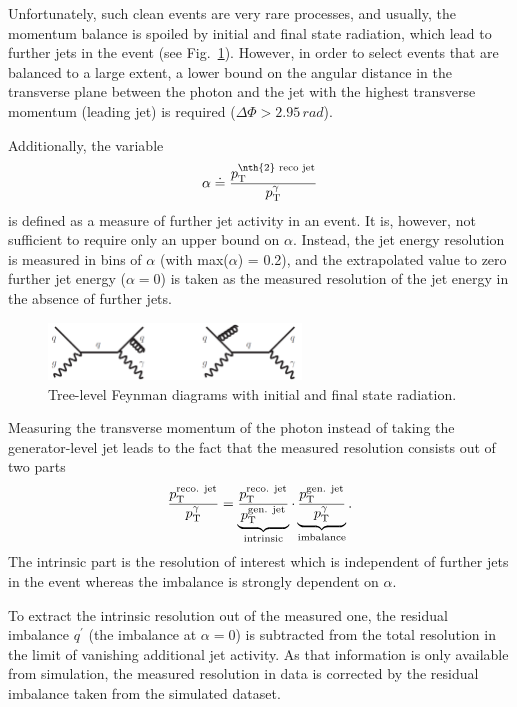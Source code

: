 Unfortunately, such clean events are very rare processes, and usually, the momentum balance is spoiled by initial and final state radiation, which lead to further jets in the event 
(see \mbox{Fig. \ref{res:fig:FeynmanDiagramsWithRadiation}}). 
However, in order to select events that are balanced to a large extent, a lower bound 
on the angular distance in the transverse plane between the photon and the jet with the highest transverse momentum (leading jet) is required ($\Delta\Phi>2.95\,\unit{rad}$). 

Additionally, the variable 
\begin{equation*}\label{res:eq:alphaDef}
\alpha \doteq \frac{\pt^{\text{\nth{2} reco jet}}}{\pt^{\gamma}}
\end{equation*} 
is defined as a measure of further jet activity in an event. 
It is, however, not sufficient to require only an upper bound on $\alpha$. 
Instead, the jet energy resolution is measured in bins of $\alpha$ (with max($\alpha$) = 0.2), 
and the \mbox{extrapolated} value to zero further jet energy ($\alpha=0$) is taken as the measured resolution of the jet energy in the absence of further jets.
\begin{figure}[t]
  \centering
      \includegraphics[width=0.60\textwidth]{figures/resolution/generalApproach/FeynmanDiagramsWithRadiation.pdf}
  \caption{Tree-level Feynman diagrams with initial and final state radiation.}  
  \label{res:fig:FeynmanDiagramsWithRadiation}
\end{figure}

Measuring the transverse momentum of the photon instead of taking the generator-level jet \pt leads to the fact that the measured resolution consists out of two parts
\begin{equation*}\label{res:eq:splitting}
\frac{p_{\text{T}}^{\text{reco. jet}}}{p_{\text{T}}^{\gamma}} = \underbrace{\frac{p_{\text{T}}^{\text{reco. jet}}}{p_{\text{T}}^{\text{gen. jet}}}}_{\text{intrinsic}} \cdot \underbrace{\frac{p_{\text{T}}^{\text{gen. jet}}}{p_{\text{T}}^{\gamma}}}_{\text{imbalance}}.
\end{equation*}
The intrinsic part is the resolution of interest which is independent of further jets in the event whereas the imbalance is strongly dependent on $\alpha$.

To extract the intrinsic resolution out of the measured one, the residual imbalance $q^{\prime}$ (the imbalance at $\alpha = 0$) is subtracted from the total resolution in the 
limit of vanishing additional jet activity. 
As that information is only available from simulation, the measured resolution in data is corrected by the residual imbalance taken from the simulated dataset.

